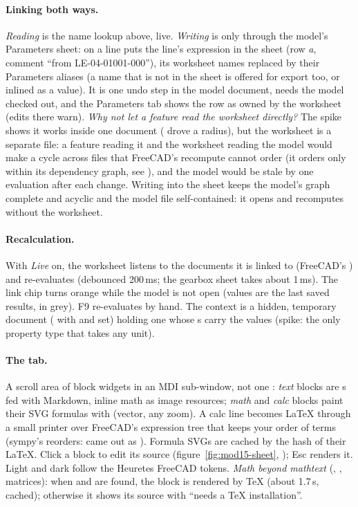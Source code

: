 \paragraph{Linking both ways.} \emph{Reading} is the name lookup above, live. \emph{Writing} is only through the
model's Parameters sheet:  on a line puts the line's expression in the sheet (row \emph{a},
comment ``from LE-04-01001-000''), its worksheet names replaced by their Parameters aliases (a name that is not in the
sheet is offered for export too, or inlined as a value). It is one undo step in the model document, needs the model
checked out, and the Parameters tab shows the row as owned by the worksheet (edits there warn). \emph{Why not let a
feature read the worksheet directly?} The spike shows it works inside one document ( drove a
radius), but the worksheet is a separate file: a feature reading it and the worksheet reading the model would make a
cycle across files that FreeCAD's recompute cannot order (it orders only within its dependency graph, see ), and the model would be stale by one evaluation after each change. Writing into the sheet keeps
the model's graph complete and acyclic and the model file self-contained: it opens and recomputes without the
worksheet.

\paragraph{Recalculation.} With \emph{Live} on, the worksheet listens to the documents it is linked to
(FreeCAD's ) and re-evaluates (debounced 200\,ms; the gearbox sheet takes about 1\,ms). The link
chip turns orange while the model is not open (values are the last saved results, in grey). F9 re-evaluates by hand.
The context is a hidden, temporary document ( with  and  set) holding one
 whose s carry the values (spike: the only property type that takes any unit).

\paragraph{The tab.} A scroll area of block widgets in an MDI sub-window, not one : \emph{text}
blocks are s fed with Markdown, inline math as image resources; \emph{math} and \emph{calc} blocks
paint their SVG formulas with  (vector, any zoom). A calc line becomes LaTeX through a small printer
over FreeCAD's expression tree that keeps your order of terms (sympy's  reorders:  came
out as ). Formula SVGs are cached by the hash of their LaTeX. Click a block to
edit its source (figure~\ref{fig:mod15-sheet}, ); Esc renders it. Light and dark follow the Heuretes FreeCAD tokens.
\emph{Math beyond mathtext} (, , matrices): when  and  are found, the
block is rendered by TeX (about 1.7\,s, cached); otherwise it shows its source with ``needs a TeX installation''.

